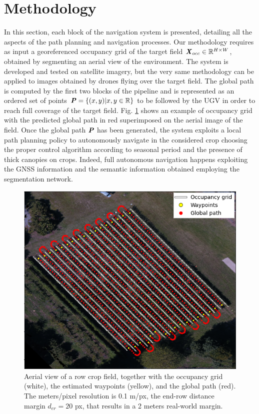 \documentclass[journal]{IEEEtran}
\begin{document}
\section{Methodology}
\label{full_pipeline}
In this section, each block of the navigation system is presented, detailing all the aspects of the path planning and navigation processes. Our methodology requires as input a georeferenced occupancy grid of the target field $\textbf{\textit{X}}_{occ} \in  \mathbb{R}^{H\times W}$, obtained by segmenting an aerial view of the environment. The system is developed and tested on satellite imagery, but the very same methodology can be applied to images obtained by drones flying over the target field.  
The global path is computed by the first two blocks of the pipeline and is represented as an ordered set of points $\textbf{\emph{P}} = \{(x,y)| x,y \in \mathbb{R}\}$ to be followed by the UGV in order to reach full coverage of the target field. Fig. \ref{fig:map_example} shows an example of occupancy grid with the predicted global path in red superimposed on the aerial image of the field. Once the global path $\textbf{\emph{P}}$ has been generated, the system exploits a local path planning policy to autonomously navigate in the considered crop choosing the proper control algorithm according to seasonal period and the presence of thick canopies on crops. Indeed, full autonomous navigation happens exploiting the GNSS information and the semantic information obtained employing the segmentation network.

\begin{figure}[!t]
\centering
\includegraphics[width=0.7\columnwidth]{map_example_with_legend.png}
\caption{Aerial view of a row crop field, together with the occupancy grid (white), the estimated waypoints (yellow), and the global path (red). The meters/pixel resolution is 0.1 m/px, the end-row distance margin $d_{er} = 20$ px, that results in a 2 meters real-world margin.}
\label{fig:map_example}
\end{figure}
\vspace{-7pt}
\end{document}
